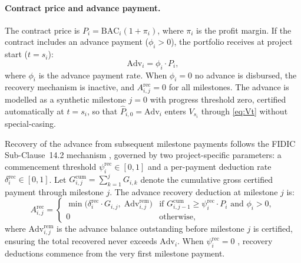 \paragraph{Contract price and advance payment.}
The contract price is $P_i = \mathrm{BAC}_i (1 + \pi_i)$, where $\pi_i$
is the profit margin. If the contract includes an advance payment
($\phi_i > 0$), the portfolio receives at project start ($t = s_i$):
\begin{equation}
  \mathrm{Adv}_i = \phi_i \cdot P_i,
  \label{eq:advance}
\end{equation}
where $\phi_i$ is the advance payment rate. When
$\phi_i = 0$ no advance is disbursed, the recovery mechanism is
inactive, and $A^{\mathrm{rec}}_{i,j} = 0$ for all milestones.
The advance is modelled as a synthetic milestone $j = 0$ with progress
threshold zero, certified automatically at $t = s_i$, so that
$\hat{P}_{i,0} = \mathrm{Adv}_i$ enters $V_{s_i}$ through
\eqref{eq:Vt} without special-casing.

Recovery of the advance from subsequent milestone payments follows the
FIDIC Sub-Clause~14.2 mechanism \citep{FIDIC2017}, governed by two
project-specific parameters: a commencement threshold
$\psi^{\mathrm{rec}}_i \in [0,1]$ and a per-payment deduction rate
$\delta^{\mathrm{rec}}_i \in [0,1]$. Let
$G^{\mathrm{cum}}_{i,j} = \sum_{k=1}^{j} G_{i,k}$ denote the
cumulative gross certified payment through milestone $j$. The advance
recovery deduction at milestone $j$ is:
\begin{equation}
  A^{\mathrm{rec}}_{i,j}
    = \begin{cases}
        \min\!\bigl(\delta^{\mathrm{rec}}_i \cdot G_{i,j},\;
          \mathrm{Adv}^{\mathrm{rem}}_{i,j}\bigr)
          & \text{if } G^{\mathrm{cum}}_{i,j-1} \geq
            \psi^{\mathrm{rec}}_i \cdot P_i
            \text{ and } \phi_i > 0, \\
        0 & \text{otherwise,}
      \end{cases}
  \label{eq:advance_rec}
\end{equation}
where $\mathrm{Adv}^{\mathrm{rem}}_{i,j}$ is the advance balance
outstanding before milestone $j$ is certified, ensuring the total
recovered never exceeds $\mathrm{Adv}_i$. When
$\psi^{\mathrm{rec}}_i = 0$ ,
recovery deductions commence from the very first milestone payment.

